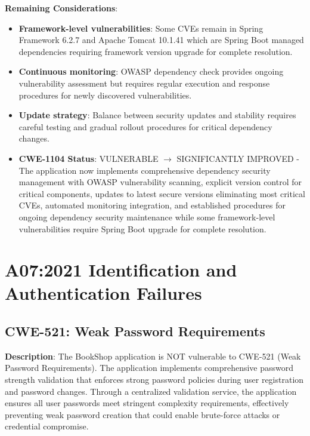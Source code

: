 \documentclass[]{UCD_CS_FYP_Report}
\begin{document}
\textbf{Remaining Considerations}:
\begin{itemize}
	\item \textbf{Framework-level vulnerabilities}: Some CVEs remain in Spring Framework 6.2.7 and Apache Tomcat 10.1.41 which are Spring Boot managed dependencies requiring framework version upgrade for complete resolution.
	\item \textbf{Continuous monitoring}: OWASP dependency check provides ongoing vulnerability assessment but requires regular execution and response procedures for newly discovered vulnerabilities.
	\item \textbf{Update strategy}: Balance between security updates and stability requires careful testing and gradual rollout procedures for critical dependency changes.
\end{itemize}

\begin{itemize}
	\item \textbf{CWE-1104 Status}: VULNERABLE $\rightarrow$ SIGNIFICANTLY IMPROVED - The application now implements comprehensive dependency security management with OWASP vulnerability scanning, explicit version control for critical components, updates to latest secure versions eliminating most critical CVEs, automated monitoring integration, and established procedures for ongoing dependency security maintenance while some framework-level vulnerabilities require Spring Boot upgrade for complete resolution.
\end{itemize}


\chapter{A07:2021 Identification and Authentication Failures}


\section{CWE-521: Weak Password Requirements}

\textbf{Description}: The BookShop application is NOT vulnerable to CWE-521 (Weak Password Requirements). The application implements comprehensive password strength validation that enforces strong password policies during user registration and password changes. Through a centralized validation service, the application ensures all user passwords meet stringent complexity requirements, effectively preventing weak password creation that could enable brute-force attacks or credential compromise.
\end{document}
